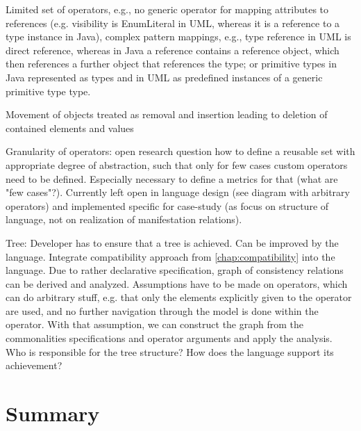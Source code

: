 Limited set of operators, e.g., no generic operator for mapping attributes to references (e.g. visibility is EnumLiteral in UML, whereas it is a reference to a type instance in Java), complex pattern mappings, e.g., type reference in UML is direct reference, whereas in Java a reference contains a reference object, which then references a further object that references the type; or primitive types in Java represented as types and in UML as predefined instances of a generic primitive type type.

Movement of objects treated as removal and insertion leading to deletion of contained elements and values


Granularity of operators: open research question how to define a reusable set with appropriate degree of abstraction, such that only for few cases custom operators need to be defined. Especially necessary to define a metrics for that (what are "few cases"?). Currently left open in language design (see diagram with arbitrary operators) and implemented specific for case-study (as focus on structure of language, not on realization of manifestation relations).

Tree: Developer has to ensure that a tree is achieved. Can be improved by the language. Integrate compatibility approach from \autoref{chap:compatibility} into the language. Due to rather declarative specification, graph of consistency relations can be derived and analyzed. Assumptions have to be made on operators, which can do arbitrary stuff, e.g. that only the elements explicitly given to the operator are used, and no further navigation through the model is done within the operator. With that assumption, we can construct the graph from the commonalities specifications and operator arguments and apply the analysis.
Who is responsible for the tree structure? How does the language support its achievement?

\section{Summary}






